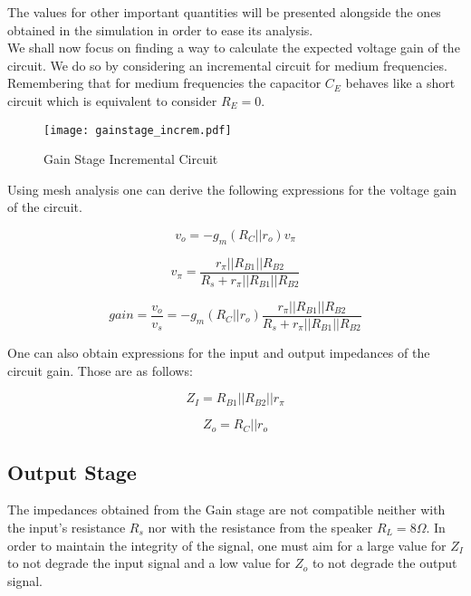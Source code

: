 The values for other important quantities will be presented alongside the ones obtained in the simulation in order to ease its analysis.\\

We shall now focus on finding a way to calculate the expected voltage gain of the circuit. We do so by considering an incremental circuit for medium frequencies. Remembering that for medium frequencies the capacitor $C_E$ behaves like a short circuit which is equivalent to consider $R_E=0$.

\begin{figure}[H]
\centering
\texttt{[image: gainstage\_increm.pdf]}
\caption{Gain Stage Incremental Circuit}
\label{fig:gain_stage_incremental_circuit}
\end{figure}

Using mesh analysis one can derive the following expressions for the voltage gain of the circuit.

\begin{equation}
v_o=-g_m(R_C||r_o)v_{\pi}
\end{equation}

\begin{equation}
v_{\pi}=\frac{r_{\pi}||R_{B1}||R_{B2}}{R_s+r_{\pi}||R_{B1}||R_{B2}}
\end{equation}

\begin{equation}
gain=\frac{v_o}{v_s}=-g_m(R_C||r_o)\frac{r_{\pi}||R_{B1}||R_{B2}}{R_s+r_{\pi}||R_{B1}||R_{B2}}
\end{equation}

One can also obtain expressions for the input and output impedances of the circuit gain. Those are as follows:


\begin{equation}
Z_I=R_{B1}||R_{B2}||r_{\pi}
\end{equation}

\begin{equation}
Z_o=R_C||r_o
\end{equation}

\subsection{Output Stage}
The impedances obtained from the Gain stage are not compatible neither with the input's resistance $R_s$ nor with the resistance from the speaker $R_{L}=8\Omega$. In order to maintain the integrity of the signal, one must aim for a large value for $Z_I$ to not degrade the input signal and a low value for $Z_o$ to not degrade the output signal.\\

